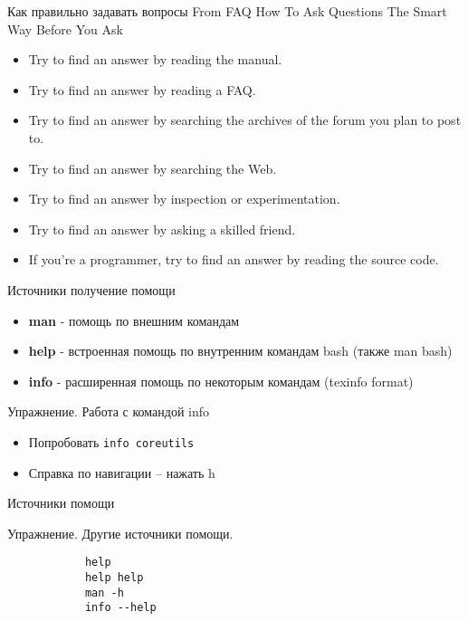
\begin{frame}[fragile]{Как правильно задавать вопросы}
From FAQ How To Ask Questions The Smart Way
Before You Ask
  \begin{itemize}
	  \item Try to find an answer by reading the manual.
	  \item Try to find an answer by reading a FAQ.
	  \item Try to find an answer by searching the archives of the forum you plan to post to.
	  \item Try to find an answer by searching the Web.
	  \item Try to find an answer by inspection or experimentation.
	  \item Try to find an answer by asking a skilled friend.
	  \item If you're a programmer, try to find an answer by reading the source code.
    \end{itemize}
\end{frame}


\begin{frame}[fragile]{Источники получение помощи}
  \begin{itemize}
    \pause
    \item \textbf{man} - помощь по внешним командам
    \pause
    \item \textbf{help} - встроенная помощь по внутренним командам bash (также man bash)
    \pause
    \item \textbf{info} - расширенная помощь по некоторым командам (texinfo format)
  \end{itemize}
     \begin{block}{Упражнение. Работа с командой info}
        \begin{itemize}
        \item   Попробовать {\tt info coreutils}
        \item   Справка по навигации -- нажать h
        \end{itemize}
	 \end{block}
\end{frame}
\begin{frame}[fragile]{Источники помощи}
		\begin{block}{Упражнение. Другие источники помощи.}
			\begin{lstlisting}
            help 
            help help
            man -h
            info --help
			\end{lstlisting}
		\end{block}
\end{frame}

